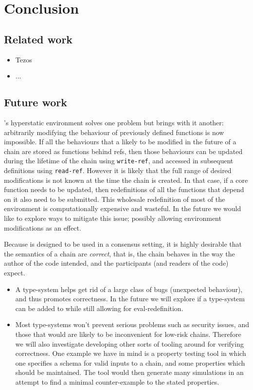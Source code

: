 \section{Conclusion}

\subsection{Related work}

\begin{itemize}
  \item Tezos
  \item ...
\end{itemize}

\subsection{Future work}

\rad's hyperstatic environment solves one problem but brings with it another:
arbitrarily modifying the behaviour of previously defined functions is now
impossible. If all the behaviours that a likely to be modified in the future of
a chain are stored as functions behind refs, then those behaviours can be
updated during the lifetime of the chain using \texttt{write-ref}, and accessed
in subsequent definitions using \texttt{read-ref}. However it is likely that the
full range of desired modifications is not known at the time the chain is
created. In that case, if a core function needs to be updated, then
redefinitions of all the functions that depend on it also need to be submitted.
This wholesale redefinition of most of the environment is computationally
expensive and wasteful. In the future we would like to explore ways to mitigate
this issue; possibly allowing environment modifications as an effect.

Because \rad{} is designed to be used in a consensus setting, it is highly
desirable that the semantics of a chain are \emph{correct}, that is, the chain
behaves in the way the author of the code intended, and the participants (and
readers of the code) expect.

\begin{itemize}
\item A type-system helps get rid of a large class of bugs (unexpected
  behaviour), and thus promotes correctness. In the future we will explore if a
  type-system can be added to \rad{} while still allowing for eval-redefinition.
\item Most type-systems won't prevent serious problems such as security issues,
  and those that would are likely to be inconvenient for low-risk chains.
  Therefore we will also investigate developing other sorts of tooling around
  \rad{} for verifying correctness. One example we have in mind is a property
  testing tool in which one specifies a schema for valid inputs to a chain, and
  some properties which should be maintained. The tool would then generate many
  simulations in an attempt to find a minimal counter-example to the stated
  properties.
\end{itemize}